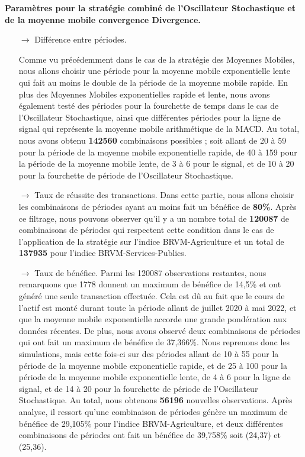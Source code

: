 
\item[\ding{226}] \textbf{Paramètres pour la stratégie combiné de l'Oscillateur Stochastique et de la moyenne mobile convergence Divergence.}

\begin{itemize}
    \item[$\rightarrow$] Différence entre périodes.
    \par{
    Comme vu précédemment dans le cas de la stratégie des Moyennes Mobiles, nous allons choisir 
    une période pour la moyenne mobile exponentielle lente qui fait au moins le double de la 
    période de la moyenne mobile rapide.
    En plus des Moyennes Mobiles exponentielles rapide et lente, nous avons également testé des 
    périodes pour la fourchette de temps dans le cas de l'Oscillateur Stochastique, ainsi que 
    différentes périodes pour la ligne de signal qui représente la moyenne mobile arithmétique de la 
    MACD.
    Au total, nous avons obtenu \textbf{142560} combinaisons possibles ; soit allant de 20 à 59 pour la 
    période de la moyenne mobile exponentielle rapide, de 40 à 159 pour la période de la moyenne 
    mobile lente, de 3 à 6 pour le signal, et de 10 à 20 pour la fourchette de période de 
    l'Oscillateur Stochastique. }


    \item[$\rightarrow$] Taux de réussite des transactions.
    Dans cette partie, nous allons choisir les combinaisons de périodes ayant au moins fait un bénéfice 
    de \textbf{80\%}.
    Après ce filtrage, nous pouvons observer qu'il y a un nombre total de \textbf{120087} de combinaisons
    de périodes qui respectent cette condition dans le cas de l'application de la stratégie sur l'indice 
    BRVM-Agriculture et un total de \textbf{137935} pour l'indice BRVM-Services-Publics.  
    

    \item[$\rightarrow$] Taux de bénéfice.
    Parmi les 120087 observations restantes, nous remarquons que 1778 donnent un maximum de bénéfice 
    de 14,5\% et ont généré une seule transaction effectuée. Cela est dû au fait que le cours de l'actif 
    est monté durant toute la période allant de juillet 2020 à mai 2022, et que la moyenne mobile exponentielle 
    accorde une grande pondération aux données récentes. 
    De plus, nous avons observé deux combinaisons de périodes qui ont fait un 
    maximum de bénéfice de 37,366\%.
    Nous reprenons donc les simulations, mais cette fois-ci sur des périodes allant
    de 10 à 55 pour la période de la moyenne mobile exponentielle rapide, et de 
    25 à 100 pour la période de la moyenne mobile exponentielle lente,
    de 4 à 6 pour la ligne de signal, et de 14 à 20 pour la fourchette de période de
    l'Oscillateur Stochastique. 
    Au total, nous obtenons \textbf{56196} nouvelles observations.
    Après analyse, il ressort qu'une combinaison de périodes génère un maximum de bénéfice
    de 29,105\% pour l'indice BRVM-Agriculture, et deux différentes combinaisons de 
    périodes ont fait un bénéfice de 39,758\% soit (24,37) et (25,36).
    


\end{itemize}
